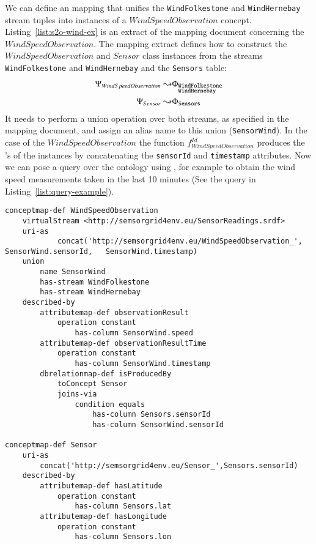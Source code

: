 \normalsize
We can define an \stwoo mapping that unifies the \texttt{WindFolkestone} and \texttt{WindHernebay} stream tuples into instances of a $WindSpeedObservation$ concept. 
Listing~\ref{list:s2o-wind-ex} is an extract of the \stwoo mapping document concerning the $WindSpeedObservation$.
The mapping extract defines how to construct the $WindSpeedObservation$ and $Sensor$ class instances from the streams \texttt{WindFolkestone} and \texttt{WindHernebay} and the \texttt{Sensors} table: 
\begin{align*}
 \Psi_{WindSpeedObservation}\leadsto 
		&\Phi_{
				\begin{subarray}{l} 
				\mathtt{WindFolkestone}\\
				\mathtt{WindHernebay} 
				\end{subarray}}\\ 
%
 \Psi_{Sensor}\leadsto 
		&\Phi_{\mathtt{Sensors}}
\end{align*} 
It needs to perform a union operation over both streams, as specified in the mapping document, and assign an alias name to this union (\texttt{SensorWind}). 
In the case of the $WindSpeedObservation$ the function $f_{WindSpeedObservation}^{Id}$ produces the \uri's of the instances by concatenating the \texttt{sensorId} and \texttt{timestamp} attributes.
Now we can pose a query over the ontology using \sparqlstr, for example to obtain the wind speed measurements taken in the last 10 minutes (See the query in Listing~\ref{list:query-example}).

\begin{lstlisting}[style=R2OStyle,language=R2O,frame=none,float,label=list:s2o-wind-ex,caption=\stwoo mapping from the data streams \texttt{WindFolkestone} and \texttt{WindHernebay} to the ontology concepts $WindSpeedObservation$.]
conceptmap-def WindSpeedObservation
	virtualStream <http://semsorgrid4env.eu/SensorReadings.srdf>
	uri-as
			concat('http://semsorgrid4env.eu/WindSpeedObservation_', SensorWind.sensorId, 	SensorWind.timestamp)
	union 
		name SensorWind
		has-stream WindFolkestone
		has-stream WindHernebay
	described-by
		attributemap-def observationResult
			operation constant
				has-column SensorWind.speed
		attributemap-def observationResultTime
			operation constant
				has-column SensorWind.timestamp
		dbrelationmap-def isProducedBy
			toConcept Sensor
			joins-via
				condition equals
					has-column Sensors.sensorId
					has-column SensorWind.sensorId

conceptmap-def Sensor
	uri-as
		concat('http://semsorgrid4env.eu/Sensor_',Sensors.sensorId)
	described-by
		attributemap-def hasLatitude
			operation constant
				has-column Sensors.lat
		attributemap-def hasLongitude
			operation constant
				has-column Sensors.lon
\end{lstlisting}



